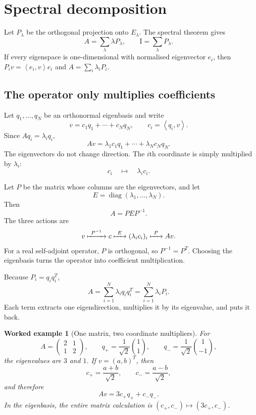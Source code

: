 \documentclass[11pt,a5paper,oneside,openany]{scrreprt}
\theoremstyle{notes}
\theoremstyle{definitions}
\newtheorem{example}[theorem]{Worked example}
\newcommand{\ip}[2]{\left\langle #1,#2\right\rangle}
\newcommand{\Id}{\mathrm{I}}
\begin{document}
\section{Spectral decomposition}

Let $P_\lambda$ be the orthogonal projection onto $E_\lambda$.  The spectral
theorem gives
\[
  \boxed{A=\sum_{\lambda}\lambda P_\lambda},
  \qquad
  \boxed{\Id=\sum_{\lambda}P_\lambda}.
\]
If every eigenspace is one-dimensional with normalised eigenvector $e_i$, then
$P_i v=\ip{e_i}{v}e_i$ and
$A=\sum_i\lambda_iP_i$.

\subsection*{The operator only multiplies coefficients}

Let $q_1,\ldots,q_N$ be an orthonormal eigenbasis and write
\[
 v=c_1q_1+\cdots+c_Nq_N,
 \qquad c_i=\ip{q_i}{v}.
\]
Since $Aq_i=\lambda_iq_i$,
\[
 \boxed{Av=\lambda_1c_1q_1+\cdots+\lambda_Nc_Nq_N.}
\]
The eigenvectors do not change direction.  The $i$th coordinate is simply
multiplied by $\lambda_i$:
\[
 c_i\quad\longmapsto\quad \lambda_i c_i.
\]

\begin{bridge}
Let $P$ be the matrix whose columns are the eigenvectors, and let
\[
 E=\operatorname{diag}(\lambda_1,\ldots,\lambda_N).
\]
Then
\[
 \boxed{A=PEP^{-1}}.
\]
The three actions are
\[
 v\xmapsto{\ P^{-1}\ }c
 \xmapsto{\ E\ }(\lambda_ic_i)_i
 \xmapsto{\ P\ }Av.
\]
For a real self-adjoint operator, $P$ is orthogonal, so $P^{-1}=P^T$.
Choosing the eigenbasis turns the operator into coefficient multiplication.
\end{bridge}

Because $P_i=q_iq_i^T$,
\[
 \boxed{A=\sum_{i=1}^{N}\lambda_iq_iq_i^T
       =\sum_{i=1}^{N}\lambda_iP_i.}
\]
Each term extracts one eigendirection, multiplies it by its eigenvalue, and
puts it back.

\begin{example}[One matrix, two coordinate multipliers]
For
\[
 A=\begin{pmatrix}2&1\\1&2\end{pmatrix},
 \qquad
 q_+=\frac1{\sqrt2}\binom11,
 \qquad
 q_-=\frac1{\sqrt2}\binom1{-1},
\]
the eigenvalues are $3$ and $1$.  If $v=(a,b)^T$, then
\[
 c_+=\frac{a+b}{\sqrt2},
 \qquad
 c_-=\frac{a-b}{\sqrt2},
\]
and therefore
\[
 \boxed{Av=3c_+q_++c_-q_-.}
\]
In the eigenbasis, the entire matrix calculation is
$(c_+,c_-)\mapsto(3c_+,c_-)$.
\end{example}
\end{document}
